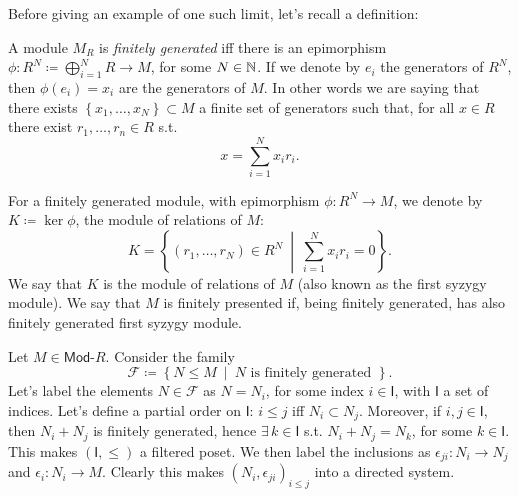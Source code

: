 Before giving an example of one such limit, let's recall a definition:
\begin{defn}
	A module $M_R$ is {\em finitely generated} iff there is an epimorphism
	$\phi\colon R^N \coloneqq \bigoplus_{i=1}^N R \to M$, for some $N \in \mathbb{N}$.
	If we denote by $e_i$ the generators of $R^N$, then $\phi(e_i) = x_i$ are the generators of $M$.
	In other words we are saying that there exists
	$\left\{ x_1, \ldots, x_N \right\} \subset M$ a finite set of generators 
	such that, for all $x \in R$ there exist $r_1, \ldots, r_n \in R$ s.t.
	\begin{equation}
	x = \sum_{i=1}^{N} x_i r_i
	.\end{equation} 
\end{defn}

\begin{defn}
	For a finitely generated module, with epimorphism $\phi\colon R^N \to M$,
	we denote by $K \coloneqq \ker \phi$, the module of relations of $M$:
	\begin{equation}
	K = 
	\left\{ \left( r_1, \ldots, r_N \right) \in R^N \ \middle|\ \sum_{i=1}^{N} x_i r_i = 0 \right\}
	.\end{equation} 
	We say that $K$ is the module of relations of $M$ (also known as the first syzygy module).
	We say that $M$ is finitely presented if, being finitely generated, has also finitely generated first syzygy module.
\end{defn}

\begin{ex}
	Let $M \in \mathsf{Mod}\text{-}R$.
	Consider the family
	\begin{equation}
	\mathcal{F} \coloneqq \left\{ N \leq M \ \middle|\ 
	N \text{ is finitely generated } \right\}
	.\end{equation} 
	Let's label the elements $N \in \mathcal{F}$ as $N= N_i$, for some index $i \in \mathsf{I}$, with $\mathsf{I}$ a set of indices.
	Let's define a partial order on $\mathsf{I}$:
	$i \leq j$ iff $N_i \subset N_j$.
	Moreover, if $i, j \in \mathsf{I}$, then $N_i + N_j$ is finitely generated, hence $\exists\, k \in \mathsf{I}$ s.t.
	$N_i + N_j = N_k$, for some $k \in \mathsf{I}$.
	This makes $\left( \mathsf{I}, \leq \right)$ a filtered poset.
	We then label the inclusions as $\epsilon_{ji}\colon N_i \to N_j$ and $\epsilon_i\colon N_i \to M$.
	Clearly this makes $\left(N_i, \epsilon_{ji}\right)_{i \leq j}$ into a directed system.
\end{ex} 

